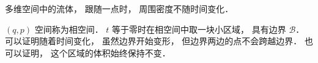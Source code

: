 
多维空间中的流体， 跟随一点时， 周围密度不随时间变化．

$(q, p)$ 空间称为相空间． $t$ 等于零时在相空间中取一块小区域， 具有边界 $\mathcal B$． 可以证明随着时间变化， 虽然边界开始变形， 但边界两边的点不会跨越边界． 也可以证明， 这个区域的体积始终保持不变．
